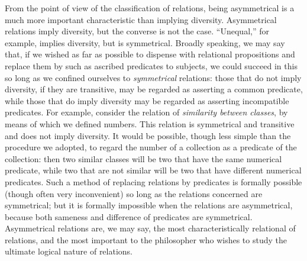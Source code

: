 {From the point of view of the classification of
relations,
being
asymmetrical is a much more important characteristic than implying
diversity. Asymmetrical relations imply diversity, but the converse is
not the case. ``Unequal,'' for example, implies diversity, but is
symmetrical. Broadly speaking, we may say that, if we wished as far as
possible to dispense with relational propositions and replace them by
such as ascribed predicates to subjects, we could succeed in this so
long as we confined ourselves to \textit{symmetrical}
relations: those that do
not imply diversity, if they are transitive, may be regarded as
asserting a common predicate, while those that do imply diversity may
be
regarded as asserting incompatible predicates. For example, consider
the relation of \textit{similarity
between classes}, by means of which we
defined numbers. This relation is symmetrical and transitive and does
not imply diversity. It would be possible, though less simple than the
procedure we adopted, to regard the number of a collection as a
predicate of the collection: then two similar classes will be two that
have the same numerical predicate, while two that are not similar will
be two that have different numerical predicates. Such a method of
replacing relations by predicates is formally possible (though often
very inconvenient) so long as the relations concerned are symmetrical;
but it is formally impossible when the relations are asymmetrical,
because both sameness and difference of predicates are symmetrical.
Asymmetrical relations are, we may   say, the most characteristically
relational of relations, and the most important to the philosopher who
wishes to study the ultimate logical nature of relations.

}
